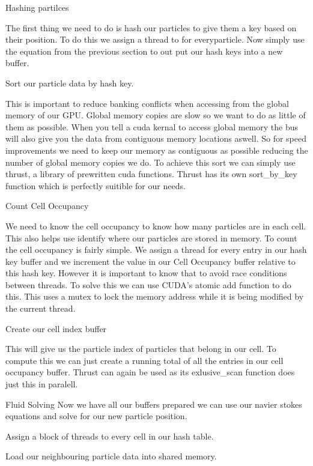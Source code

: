 \begin{DoxyEnumerate}
\item Hashing partilces\par
 The first thing we need to do is hash our particles to give them a key based on their position. To do this we assign a thread to for everyparticle. Now simply use the equation from the previous section to out put our hash keys into a new buffer.
\item Sort our particle data by hash key.\par
 This is important to reduce banking conflicts when accessing from the global memory of our G\-P\-U. Global memory copies are slow so we want to do as little of them as possible. When you tell a cuda kernal to access global memory the bus will also give you the data from contiguous memory locations aswell. So for speed improvements we need to keep our memory as contiguous as possible reducing the number of global memory copies we do. To achieve this sort we can simply use thrust, a library of prewritten cuda functions. Thrust has its own sort\-\_\-by\-\_\-key function which is perfectly suitible for our needs.
\item Count Cell Occupancy\par
 We need to know the cell occupancy to know how many particles are in each cell. This also helps use identify where our particles are stored in memory. To count the cell occupancy is fairly simple. We assign a thread for every entry in our hash key buffer and we increment the value in our Cell Occupancy buffer relative to this hash key. However it is important to know that to avoid race conditions between threads. To solve this we can use C\-U\-D\-A's atomic add function to do this. This uses a mutex to lock the memory address while it is being modified by the current thread.
\item Create our cell index buffer\par
 This will give us the particle index of particles that belong in our cell. To compute this we can just create a running total of all the entries in our cell occupancy buffer. Thrust can again be used as its exlusive\-\_\-scan function does just this in paralell.
\item Fluid Solving Now we have all our buffers prepared we can use our navier stokes equations and solve for our new particle position.
\begin{DoxyEnumerate}
\item Assign a block of threads to every cell in our hash table.
\item Load our neighbouring particle data into shared memory.\par

\end{DoxyEnumerate}
\end{DoxyEnumerate}
